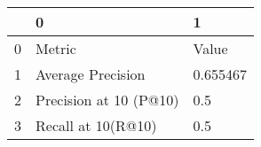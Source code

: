 \begin{tabular}{lll}
\toprule
{} &                       0 &         1 \\
\midrule
0 &                  Metric &     Value \\
1 &       Average Precision &  0.655467 \\
2 &  Precision at 10 (P@10) &       0.5 \\
3 &      Recall at 10(R@10) &       0.5 \\
\bottomrule
\end{tabular}

